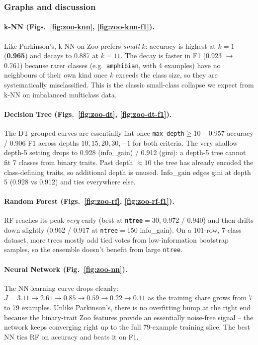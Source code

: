 \documentclass[11pt]{article}
\begin{document}
\subsubsection{Graphs and discussion}

\paragraph{k-NN (Figs.~\ref{fig:zoo-knn}, \ref{fig:zoo-knn-f1}).}
Like Parkinson's, k-NN on Zoo prefers \emph{small} $k$: accuracy is highest at $k{=}1$ (\textbf{0.965}) and decays to 0.887 at $k{=}11$. The decay is faster in F1 (0.923 $\to$ 0.761) because rarer classes (e.g.\ \texttt{amphibian}, with 4 examples) have no neighbours of their own kind once $k$ exceeds the class size, so they are systematically misclassified. This is the classic small-class collapse we expect from k-NN on imbalanced multiclass data.

\paragraph{Decision Tree (Figs.~\ref{fig:zoo-dt}, \ref{fig:zoo-dt-f1}).}
The DT grouped curves are essentially flat once \texttt{max\_depth}$\geq 10$ -- 0.957 accuracy / 0.906 F1 across depths $10, 15, 20, 30, -1$ for both criteria. The very shallow depth-5 setting drops to 0.928 (info\_gain) / 0.912 (gini): a depth-5 tree cannot fit 7 classes from binary traits. Past depth $\approx 10$ the tree has already encoded the class-defining traits, so additional depth is unused. Info\_gain edges gini at depth 5 (0.928 vs 0.912) and ties everywhere else.

\paragraph{Random Forest (Figs.~\ref{fig:zoo-rf}, \ref{fig:zoo-rf-f1}).}
RF reaches its peak \emph{very} early (best at \textbf{\texttt{ntree}$=30$}, 0.972 / 0.940) and then drifts down slightly (0.962 / 0.917 at \texttt{ntree}$=$150 info\_gain). On a 101-row, 7-class dataset, more trees mostly add tied votes from low-information bootstrap samples, so the ensemble doesn't benefit from large \texttt{ntree}.

\paragraph{Neural Network (Fig.~\ref{fig:zoo-nn}).}
The NN learning curve drops cleanly: $J=3.11 \to 2.61 \to 0.85 \to 0.59 \to 0.22 \to 0.11$ as the training share grows from 7 to 79 examples. Unlike Parkinson's, there is no overfitting bump at the right end because the binary-trait Zoo features provide an essentially noise-free signal -- the network keeps converging right up to the full 79-example training slice. The best NN ties RF on accuracy and beats it on F1.
\end{document}

